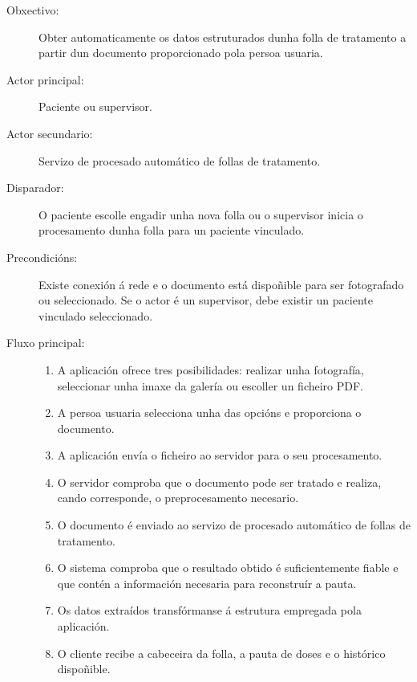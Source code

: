 \begin{description}

\item[Obxectivo:] Obter automaticamente os datos estruturados dunha folla de
tratamento a partir dun documento proporcionado pola persoa usuaria.

\item[Actor principal:] Paciente ou supervisor.

\item[Actor secundario:] Servizo de procesado automático de follas de
tratamento.

\item[Disparador:] O paciente escolle engadir unha nova folla ou o supervisor
inicia o procesamento dunha folla para un paciente vinculado.

\item[Precondicións:] Existe conexión á rede e o documento está dispoñible para
ser fotografado ou seleccionado. Se o actor é un supervisor, debe existir un
paciente vinculado seleccionado.

\item[Fluxo principal:] \hfill
\begin{enumerate}
    \item A aplicación ofrece tres posibilidades: realizar unha fotografía,
    seleccionar unha imaxe da galería ou escoller un ficheiro PDF.

    \item A persoa usuaria selecciona unha das opcións e proporciona o documento.

    \item A aplicación envía o ficheiro ao servidor para o seu procesamento.

    \item O servidor comproba que o documento pode ser tratado e realiza, cando
    corresponde, o preprocesamento necesario.

    \item O documento é enviado ao servizo de procesado automático de follas de
    tratamento.

    \item O sistema comproba que o resultado obtido é suficientemente fiable e
    que contén a información necesaria para reconstruír a pauta.

    \item Os datos extraídos transfórmanse á estrutura empregada pola aplicación.

    \item O cliente recibe a cabeceira da folla, a pauta de doses e o histórico
    dispoñible.


\end{enumerate}
\end{description}
